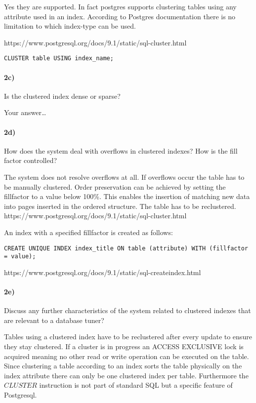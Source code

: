 \documentclass[11pt]{scrartcl}
\begin{document}
Yes they are supported. In fact postgres supports clustering tables using any attribute used in an index.
According to Postgres documentation there is no limitation to which index-type can be used.

https://www.postgresql.org/docs/9.1/static/sql-cluster.html

\begin{verbatim}
CLUSTER table USING index_name;
\end{verbatim}


\paragraph{2c)} Is the clustered index dense or sparse?


\smallskip

Your answer\dots

\paragraph{2d)} How does the system deal with overflows in clustered indexes?
How is the fill factor controlled?

The system does not resolve overflows at all. If overflows occur the table has to be manually clustered. Order preservation
can be achieved by setting the fillfactor to a value below 100\%. This enables the insertion of matching new data into pages
inserted in the ordered structure. The table has to be reclustered.
https://www.postgresql.org/docs/9.1/static/sql-cluster.html

An index with a specified fillfactor is created as follows:
\begin{verbatim}
CREATE UNIQUE INDEX index_title ON table (attribute) WITH (fillfactor = value);
\end{verbatim}
https://www.postgresql.org/docs/9.1/static/sql-createindex.html


\paragraph{2e)} Discuss any further characteristics of the system
related to clustered indexes that are relevant to a database
tuner?

Tables using a clustered index have to be reclustered after every update to ensure they stay clustered.
If a cluster is in progress an ACCESS EXCLUSIVE lock is acquired meaning no other read or write operation can be executed
on the table.
Since clustering a table according to an index sorts the table physically on the index attribute there can only be one clustered index per table.
Furthermore the $CLUSTER$ instruction is not part of standard SQL but a specific feature of Postgresql.
\end{document}
